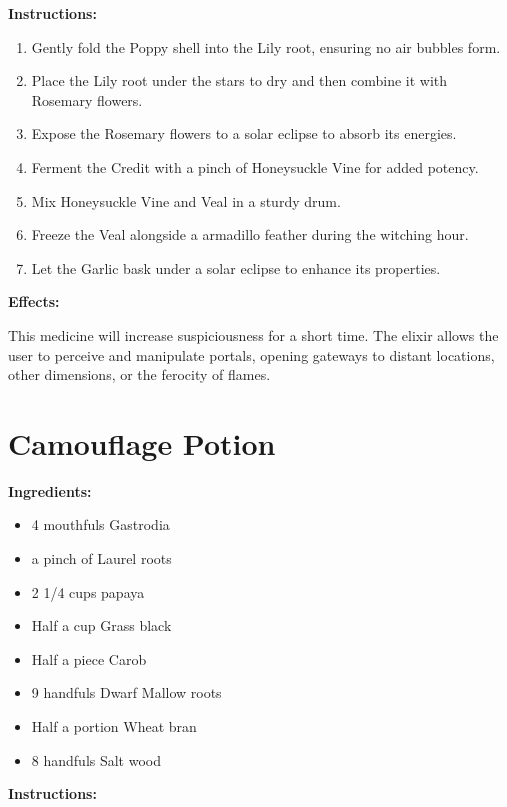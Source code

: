 \documentclass{article}
\begin{document}
\textbf{Instructions:}

\begin{enumerate}
  \item Gently fold the Poppy shell into the Lily root, ensuring no air bubbles form.
  \item Place the Lily root under the stars to dry and then combine it with Rosemary flowers.
  \item Expose the Rosemary flowers to a solar eclipse to absorb its energies.
  \item Ferment the Credit with a pinch of Honeysuckle Vine for added potency.
  \item Mix Honeysuckle Vine and Veal in a sturdy drum.
  \item Freeze the Veal alongside a armadillo feather during the witching hour.
  \item Let the Garlic bask under a solar eclipse to enhance its properties.
\end{enumerate}

\textbf{Effects:}

This medicine will increase suspiciousness for a short time. The elixir allows the user to perceive and manipulate portals, opening gateways to distant locations, other dimensions, or the ferocity of flames.

\newpage
\section*{Camouflage Potion}

\textbf{Ingredients:}

\begin{itemize}
  \item 4 mouthfuls Gastrodia
  \item a pinch of Laurel roots
  \item 2 1/4 cups papaya
  \item Half a cup Grass black
  \item Half a piece Carob
  \item 9 handfuls Dwarf Mallow roots
  \item Half a portion Wheat bran
  \item 8 handfuls Salt wood
\end{itemize}

\textbf{Instructions:}
\end{document}
